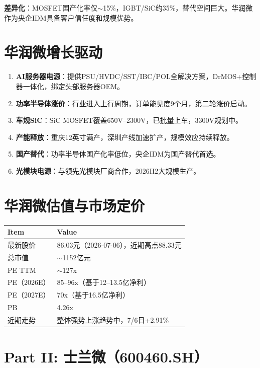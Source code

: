 \documentclass[a4paper,11pt,fontset=none]{ctexart}
\begin{document}
\textbf{差异化}：MOSFET国产化率仅$\sim$15\%，IGBT/SiC约35\%，替代空间巨大。华润微作为央企IDM具备客户信任度和规模优势。

\section{华润微增长驱动}

\begin{enumerate}
  \item \textbf{AI服务器电源}：提供PSU/HVDC/SST/IBC/POL全解决方案，DrMOS+控制器一体化，绑定头部服务器OEM。
  \item \textbf{功率半导体涨价}：行业进入上行周期，订单能见度9个月，第二轮涨价启动。
  \item \textbf{车规SiC}：SiC MOSFET覆盖650V--2300V，已批量上车，3300V规划中。
  \item \textbf{产能释放}：重庆12英寸满产，深圳产线加速扩产，规模效应持续释放。
  \item \textbf{国产替代}：功率半导体国产化率低位，央企IDM为国产替代首选。
  \item \textbf{光模块电源}：与领先光模块厂商合作，2026H2大规模生产。
\end{enumerate}

\section{华润微估值与市场定价}

\begin{tabularx}{\textwidth}{L{3cm}X}
\toprule
\textbf{Item} & \textbf{Value} \\
\midrule
最新股价 & 86.03元（2026-07-06），近期高点88.33元 \\
总市值 & $\sim$1152亿元 \\
PE TTM & $\sim$127x \\
PE（2026E） & 85--96x（基于12--13.5亿净利） \\
PE（2027E） & 70x（基于16.5亿净利） \\
PB & 4.26x \\
近期走势 & 整体强势上涨趋势中，7/6日+2.91\% \\
\bottomrule
\end{tabularx}

\newpage
\section*{\color{navy}\large Part II: 士兰微（600460.SH）}
\end{document}
